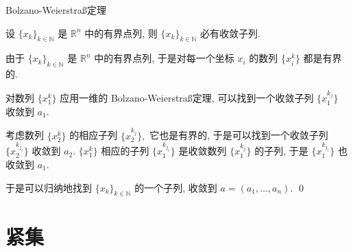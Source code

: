 
\begin{frame}{Bolzano-Weierstra\ss 定理}

\begin{thm}
设 $\{ x_k \}_{k\in\mathbb{N}}$ 是 $\mathbb{R}^n$ 中的有界点列, 则 $\{ x_k \}_{k\in\mathbb{N}}$ 必有收敛子列.
\end{thm}

\pause
\vspace{1em}

\startproof[bg=yellow, fg=red]
由于 $\{ x_k \}_{k\in\mathbb{N}}$ 是 $\mathbb{R}^n$ 中的有界点列, 于是对每一个坐标 $x_i$ 的数列 $\{ x_i^k \}$ 都是有界的.

\pause

对数列 $\{ x_1^k\}$ 应用一维的 Bolzano-Weierstra\ss 定理, 可以找到一个收敛子列 $\{ x_1^{k_j} \}$ 收敛到 $a_1.$

考虑数列 $\{ x_2^k\}$ 的相应子列 $\{ x_2^{k_j} \},$ 它也是有界的, 于是可以找到一个收敛子列 $\{ x_2^{k_{j_\ell}} \}$ 收敛到 $a_2.$
$\{ x_1^k\}$ 相应的子列 $\{ x_1^{k_{j_\ell}} \}$ 是收敛数列 $\{ x_1^{k_j} \}$ 的子列, 于是 $\{ x_1^{k_{j_\ell}} \}$ 也收敛到 $a_1.$

\pause

于是可以归纳地找到  $\{ x_k \}_{k\in\mathbb{N}}$ 的一个子列, 收敛到 $a = (a_1, \dots, a_n).$
\qed

\end{frame}


\section{紧集}


